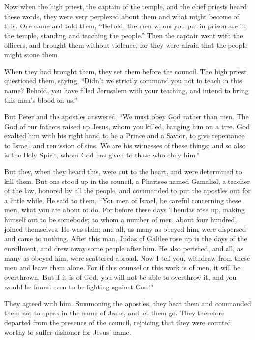  Now when the high priest, the captain of the temple, and
the chief priests heard these words, they were very perplexed about them
and what might become of this.  One came and told them,
``Behold, the men whom you put in prison are in the temple, standing and
teaching the people.''  Then the captain went with the
officers, and brought them without violence, for they were afraid that
the people might stone them.

 When they had brought them, they set them before the
council. The high priest questioned them,  saying,
``Didn't we strictly command you not to teach in this name? Behold, you
have filled Jerusalem with your teaching, and intend to bring this man's
blood on us.''

 But Peter and the apostles answered, ``We must obey God
rather than men.  The God of our fathers raised up Jesus,
whom you killed, hanging him on a tree.  God exalted him
with his right hand to be a Prince and a Savior, to give repentance to
Israel, and remission of sins.  We are his witnesses of
these things; and so also is the Holy Spirit, whom God has given to
those who obey him.''

 But they, when they heard this, were cut to the heart,
and were determined to kill them.  But one stood up in
the council, a Pharisee named Gamaliel, a teacher of the law, honored by
all the people, and commanded to put the apostles out for a little
while.  He said to them, ``You men of Israel, be careful
concerning these men, what you are about to do.  For
before these days Theudas rose up, making himself out to be somebody; to
whom a number of men, about four hundred, joined themselves. He was
slain; and all, as many as obeyed him, were dispersed and came to
nothing.  After this man, Judas of Galilee rose up in the
days of the enrollment, and drew away some people after him. He also
perished, and all, as many as obeyed him, were scattered abroad.
 Now I tell you, withdraw from these men and leave them
alone. For if this counsel or this work is of men, it will be
overthrown.  But if it is of God, you will not be able to
overthrow it, and you would be found even to be fighting against God!''

 They agreed with him. Summoning the apostles, they beat
them and commanded them not to speak in the name of Jesus, and let them
go.  They therefore departed from the presence of the
council, rejoicing that they were counted worthy to suffer dishonor for
Jesus' name.

